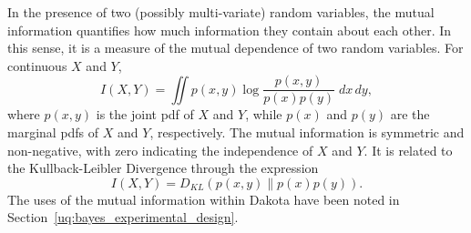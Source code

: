 In the presence of two (possibly multi-variate) random variables, the mutual 
information quantifies how much information they contain about each other. In 
this sense, it is a measure of the mutual dependence of two random variables. 
For continuous $X$ and $Y$, 
\begin{equation}
I(X, Y) = \iint p(x,y) \log \frac{ p(x,y) }{p(x)p(y)} \; dx \, dy,
\end{equation}
where $p(x,y)$ is the joint pdf of $X$ and $Y$, while $p(x)$ and $p(y)$ are the 
marginal pdfs of $X$ and $Y$, respectively. The mutual information is symmetric 
and non-negative, with zero indicating the independence of $X$ and $Y$. It is 
related to the Kullback-Leibler Divergence through the expression
\begin{equation}
I(X,Y) = D_{KL} ( p(x,y) \| p(x) p(y) ). 
\end{equation}
The uses of the mutual information within Dakota have been noted in 
Section~\ref{uq:bayes_experimental_design}.













